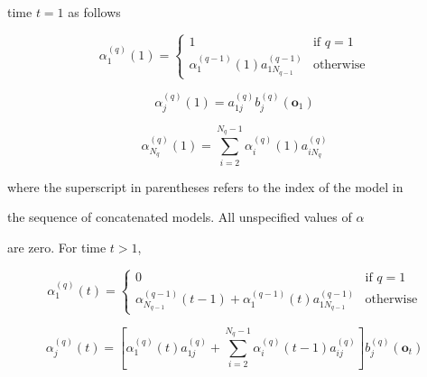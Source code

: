 time $t=1$ as follows


\[


   \alpha^{(q)}_{1}(1) = 


        \left\{ \begin{array}{cl}


                              1 & \mbox{if $q=1$} \\


                   \alpha^{(q-1)}_1(1)  a^{(q-1)}_{1N_{q-1}} & \mbox{otherwise}


                \end{array}


        \right.


\]


\[


   \alpha^{(q)}_{j}(1) = a^{(q)}_{1j} b^{(q)}_j(\bm{o}_1)


\]


\[


   \alpha^{(q)}_{N_q}(1) = 


        \sum_{i=2}^{N_q-1} \alpha^{(q)}_{i}(1) a^{(q)}_{iN_q}


\]


where the superscript in parentheses refers to the index of the model in 


the sequence of concatenated models.  All unspecified values of $\alpha$


are zero.  For time $t > 1$, 


\[


   \alpha^{(q)}_{1}(t) = 


        \left\{ \begin{array}{cl}


                              0 & \mbox{if $q=1$} \\


                   \alpha^{(q-1)}_{N_{q-1}}(t-1) + 


                   \alpha^{(q-1)}_1(t)  a^{(q-1)}_{1N_{q-1}}& \mbox{otherwise}


                \end{array}


        \right.


\]


\[


    \alpha^{(q)}_j(t) = 


          \left[ 


               \alpha^{(q)}_1(t) a^{(q)}_{1j} + 


                \sum_{i=2}^{N_q-1} \alpha^{(q)}_{i}(t-1) a^{(q)}_{ij}


          \right]


          b^{(q)}_j(\bm{o}_t)


\]


